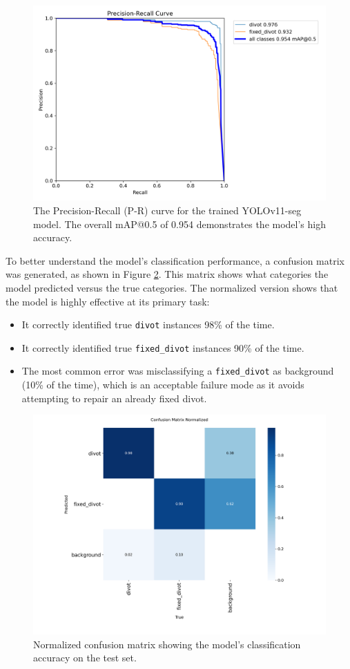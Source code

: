 \begin{figure}[h!]
    \centering
    \includegraphics[width=0.8\linewidth]{figures/precision_recall_curve.png}
    \caption{The Precision-Recall (P-R) curve for the trained YOLOv11-seg model. The overall mAP@0.5 of 0.954 demonstrates the model's high accuracy.}
    \label{fig:pr_curve}
\end{figure}

To better understand the model's classification performance, a confusion matrix was generated, as shown in Figure \ref{fig:confusion_matrix}. This matrix shows what categories the model predicted versus the true categories. The normalized version shows that the model is highly effective at its primary task:
\begin{itemize}
    \item It correctly identified true \texttt{divot} instances 98\% of the time.
    \item It correctly identified true \texttt{fixed\_divot} instances 90\% of the time.
    \item The most common error was misclassifying a \texttt{fixed\_divot} as background (10\% of the time), which is an acceptable failure mode as it avoids attempting to repair an already fixed divot.
\end{itemize}

\begin{figure}[h!]
    \centering
    \includegraphics[width=0.7\linewidth]{figures/confusion_matrix_normalized.png}
    \caption{Normalized confusion matrix showing the model's classification accuracy on the test set.}
    \label{fig:confusion_matrix}
\end{figure}


